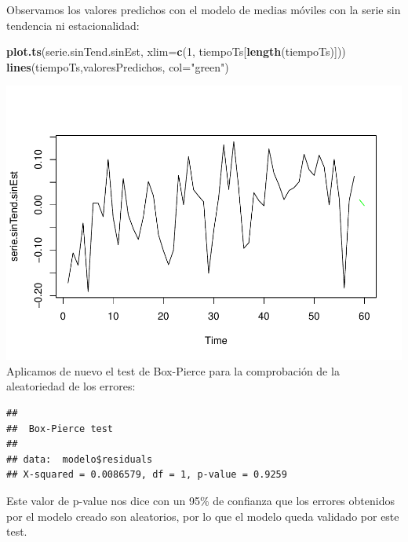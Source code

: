 \documentclass[]{article}
\newenvironment{Shaded}{\begin{snugshade}}{\end{snugshade}}
\newcommand{\KeywordTok}[1]{\textcolor[rgb]{0.13,0.29,0.53}{\textbf{#1}}}
\newcommand{\DataTypeTok}[1]{\textcolor[rgb]{0.13,0.29,0.53}{#1}}
\newcommand{\DecValTok}[1]{\textcolor[rgb]{0.00,0.00,0.81}{#1}}
\newcommand{\StringTok}[1]{\textcolor[rgb]{0.31,0.60,0.02}{#1}}
\newcommand{\OperatorTok}[1]{\textcolor[rgb]{0.81,0.36,0.00}{\textbf{#1}}}
\newcommand{\NormalTok}[1]{#1}
\begin{document}
Observamos los valores predichos con el modelo de medias móviles con la
serie sin tendencia ni estacionalidad:

\begin{Shaded}
\begin{Highlighting}[]
\KeywordTok{plot.ts}\NormalTok{(serie.sinTend.sinEst, }\DataTypeTok{xlim=}\KeywordTok{c}\NormalTok{(}\DecValTok{1}\NormalTok{, tiempoTs[}\KeywordTok{length}\NormalTok{(tiempoTs)])) }
\KeywordTok{lines}\NormalTok{(tiempoTs,valoresPredichos, }\DataTypeTok{col=}\StringTok{"green"}\NormalTok{)}
\end{Highlighting}
\end{Shaded}

\includegraphics{timeSeries_files/figure-latex/unnamed-chunk-28-1.pdf}
Aplicamos de nuevo el test de Box-Pierce para la comprobación de la
aleatoriedad de los errores:

\begin{Shaded}
\end{Shaded}

\begin{verbatim}
## 
##  Box-Pierce test
## 
## data:  modelo$residuals
## X-squared = 0.0086579, df = 1, p-value = 0.9259
\end{verbatim}

Este valor de p-value nos dice con un 95\% de confianza que los errores
obtenidos por el modelo creado son aleatorios, por lo que el modelo
queda validado por este test.
\end{document}
